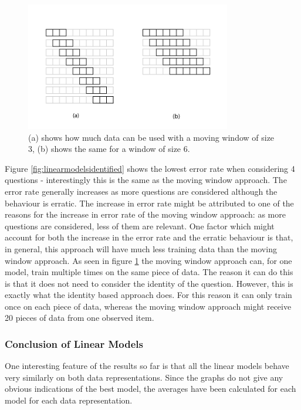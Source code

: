 \begin{figure}[h!]
\centering
\includegraphics[width=0.8\textwidth]{images/movingwindowdata.png}
\caption{(a) shows how much data can be used with a moving window of size 3, (b) shows the same for a window of size 6.}
\label{fig:movingwindowdata}
\end{figure}

Figure \ref{fig:linearmodelsidentified} shows the lowest error rate when considering 4 questions - interestingly this is the same as the moving window approach. The error rate generally increases as more questions are considered although the behaviour is erratic.
The increase in error rate might be attributed to one of the reasons for the increase in error rate of the moving window approach: as more questions are considered, less of them are relevant.
One factor which might account for both the increase in the error rate and the erratic behaviour is that, in general, this approach will have much less training data than the moving window approach.
As seen in figure \ref{fig:movingwindowdata} the moving window approach can, for one model, train multiple times on the same piece of data. The reason it can do this is that it does not need to consider the identity of the question. However, this is exactly what the identity based approach does. For this reason it can only train once on each piece of data, whereas the moving window approach might receive 20 pieces of data from one observed item.

\subsubsection{Conclusion of Linear Models}
One interesting feature of the results so far is that all the linear models behave very similarly on both data representations. Since the graphs do not give any obvious indications of the best model, the averages have been calculated for each model for each data representation.

